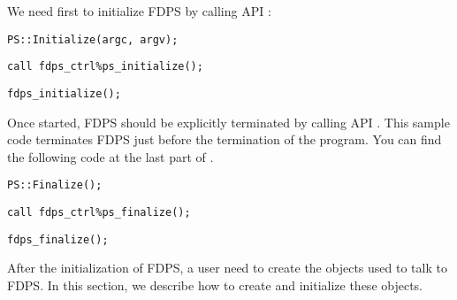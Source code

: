 We need first to initialize FDPS by calling API :

\ifCpp %
\begin{lstlisting}[caption=Initialize FDPS]
PS::Initialize(argc, argv);
\end{lstlisting}
\endifCpp
\ifFtn %
\begin{lstlisting}[caption=Initialize FDPS]
call fdps_ctrl%ps_initialize();
\end{lstlisting}
\endifFtn
\ifC %
\begin{lstlisting}[caption=Initialize FDPS]
fdps_initialize();
\end{lstlisting}
\endifC

Once started, FDPS should be explicitly terminated by calling API . This sample code terminates FDPS just before the termination of the program. You can find the following code at the last part of \fileNameOfMainFunc.

\ifCpp %
\begin{lstlisting}[caption=Finalize FDPS]
PS::Finalize();
\end{lstlisting}
\endifCpp
\ifFtn %
\begin{lstlisting}[caption=Finalize FDPS]
call fdps_ctrl%ps_finalize();
\end{lstlisting}
\endifFtn
\ifC %
\begin{lstlisting}[caption=Finalize FDPS]
fdps_finalize();
\end{lstlisting}
\endifC


After the initialization of FDPS, a user need to create the objects used to talk to FDPS. In this section, we describe how to create and initialize these objects.

